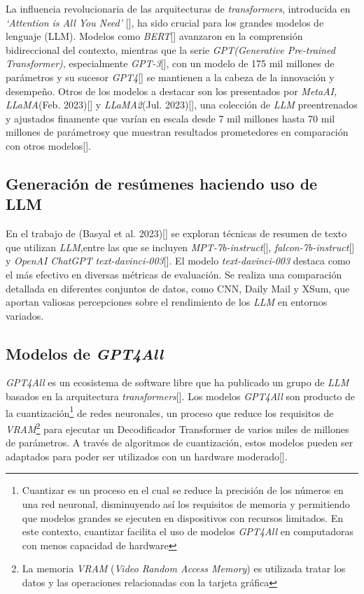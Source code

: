     La influencia revolucionaria de las arquitecturas de \emph{transformers}, introducida en \emph{`Attention is All You Need'} [\cite{attention}], ha sido crucial para los grandes modelos de lenguaje (LLM). Modelos como \emph{BERT}[\cite{BERT}] avanzaron en la comprensión bidireccional del contexto, mientras que la serie \emph{GPT}\emph{(Generative Pre-trained Transformer)}, especialmente \emph{GPT-3}[\cite{brown2020language}], con un modelo de 175 mil millones de parámetros y su sucesor \emph{GPT4}[\cite{openai2023gpt4}] se mantienen a la cabeza de la innovación y desempeño. Otros de los modelos a destacar son los presentados por \emph{MetaAI, LLaMA}(Feb. 2023)[\cite{llamapaper}] y \emph{LLaMA2}(Jul. 2023)[\cite{llamapaper2}], una colección de \emph{LLM} preentrenados y ajustados finamente que varían en escala desde 7 mil millones hasta 70 mil millones de parámetrosy que muestran resultados prometedores en comparación con otros modelos[\cite{metallama}]. 
    
    \subsection{Generación de resúmenes haciendo uso de LLM}

    En el trabajo de (Basyal et al. 2023)[\cite{basyal2023text}] se exploran técnicas de resumen de texto que utilizan \emph{LLM},entre las que se incluyen \emph{MPT-7b-instruct}[\cite{mpt}], \emph{falcon-7b-instruct}[\cite{falcon}] y \emph{OpenAI ChatGPT} \emph{text-davinci-003}[\cite{brown2020language}]. El modelo \emph{text-davinci-003} destaca como el más efectivo en diversas métricas de evaluación. Se realiza una comparación detallada en diferentes conjuntos de datos, como CNN, Daily Mail y XSum, que aportan valiosas percepciones sobre el rendimiento de los \emph{LLM} en entornos variados. 

    \subsection{Modelos de \emph{GPT4All}}

        \emph{GPT4All} es un ecosistema de software libre que ha publicado un grupo de \emph{LLM} basados en la arquitectura \emph{transformers}[\cite{attention}]. Los modelos \emph{GPT4All} son producto de la cuantización\footnote{Cuantizar es un proceso en el cual se reduce la precisión de los números en una red neuronal, disminuyendo así los requisitos de memoria y permitiendo que modelos grandes se ejecuten en dispositivos con recursos limitados. En este contexto, cuantizar facilita el uso de modelos \emph{GPT4All} en computadoras con menos capacidad de hardware} de redes neuronales, un proceso que reduce los requisitos de \emph{VRAM}\footnote{La memoria \emph{VRAM} (\emph{Video Random Access Memory}) es utilizada tratar los datos y las operaciones relacionadas con la tarjeta gráfica} para ejecutar un Decodificador Transformer de varios miles de millones de parámetros. A través de algoritmos de cuantización, estos modelos pueden ser adaptados para poder ser utilizados con un hardware moderado[\cite{webgpt4all}].
        
